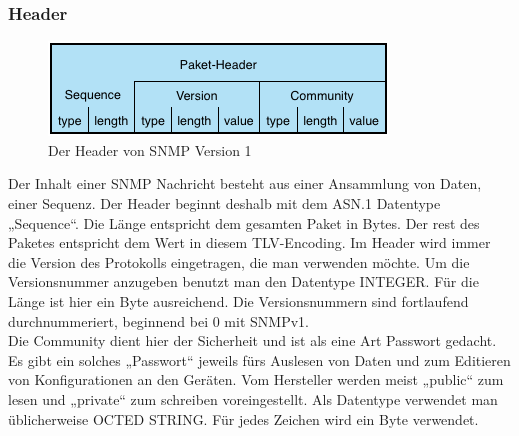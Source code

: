 \documentclass[11pt,a4paper]{article}
\begin{document}
\subsubsection{Header}
\begin{figure}[h]
	\centering
	\includegraphics[scale=1]{Bilder/SNMPv1-Header.png}
	\caption{Der Header von SNMP Version 1}
\end{figure}
Der Inhalt einer SNMP Nachricht besteht aus einer Ansammlung von Daten, einer Sequenz. Der Header beginnt deshalb mit dem ASN.1 Datentype „Sequence“. Die Länge entspricht dem gesamten Paket in Bytes. Der rest des Paketes entspricht dem Wert in diesem TLV-Encoding. Im Header wird immer die Version des Protokolls eingetragen, die man verwenden möchte. Um die Versionsnummer anzugeben benutzt man den Datentype INTEGER. Für die Länge ist hier ein Byte ausreichend. Die Versionsnummern sind fortlaufend durchnummeriert, beginnend bei 0 mit SNMPv1.\\
Die Community dient hier der Sicherheit und ist als eine Art Passwort gedacht. Es gibt ein solches „Passwort“ jeweils fürs Auslesen von Daten und zum Editieren von Konfigurationen an den Geräten. Vom Hersteller werden meist „public“ zum lesen und „private“ zum schreiben voreingestellt. Als Datentype verwendet man üblicherweise OCTED STRING. Für jedes Zeichen wird ein Byte verwendet.\\
\end{document}
